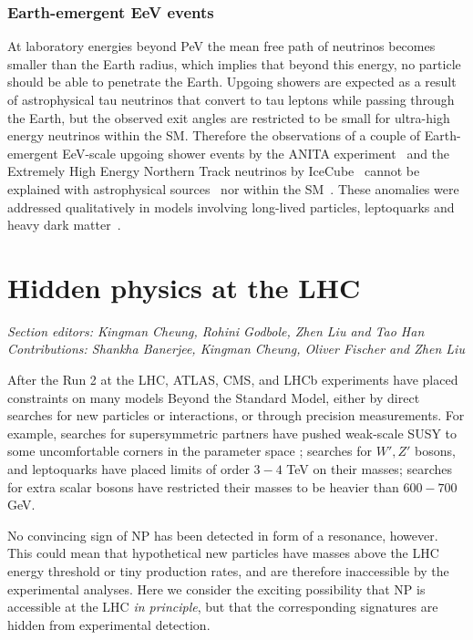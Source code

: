 \documentclass[10pt]{article}
\begin{document}
\subsubsection{Earth-emergent EeV events}
%
At laboratory energies beyond PeV the mean free path of neutrinos becomes smaller than the Earth radius, which implies that beyond this energy, no particle should be able to penetrate the Earth. Upgoing showers are expected as a result of astrophysical tau neutrinos that convert to tau leptons while passing through the Earth, but the observed exit angles are restricted to be small for ultra-high energy neutrinos within the SM. 
Therefore the observations of a couple of Earth-emergent EeV-scale upgoing shower events by the ANITA experiment~\cite{ANITA:2016vrp, ANITA:2020sds} and the Extremely High Energy Northern Track neutrinos by IceCube~\cite{Aartsen:2018vtx} cannot be explained with astrophysical sources~\cite{IceCube:2020gbx} nor within the SM~\cite{Fox:2018syq}.
These anomalies were addressed qualitatively in models involving long-lived particles, leptoquarks and heavy dark matter~\cite{Chauhan:2018lnq,BhupalDev:2020zcy, Collins:2018jpg, Heurtier:2019git}.


\section{Hidden physics at the LHC}
%
{\it\small Section editors: Kingman Cheung, Rohini Godbole, Zhen Liu and Tao Han\\
%
Contributions: Shankha Banerjee, Kingman Cheung, Oliver Fischer and Zhen Liu}

\medskip\noindent
After the Run 2 at the LHC, ATLAS, CMS, and LHCb experiments have placed
constraints on many models Beyond the Standard Model, either by direct searches for new particles or interactions, or through precision measurements.
For example, searches for supersymmetric partners have pushed weak-scale SUSY to some uncomfortable corners in the parameter space 
\cite{Sirunyan:2019ctn,Sirunyan:2019mbp,Aad:2020nyj}; 
searches for $W',Z'$ bosons, and leptoquarks have placed limits of
order $3-4$ TeV on their masses; searches for extra scalar bosons have restricted their
masses to be heavier than $600-700$ GeV.

No convincing sign of NP has been detected in form of a resonance, however. This could mean that hypothetical new particles have masses above the LHC energy threshold or tiny production rates, and are therefore inaccessible by the experimental analyses. 
Here we consider the exciting possibility that NP is accessible at the LHC {\it in principle}, but that the corresponding signatures are hidden from experimental detection.
\end{document}
